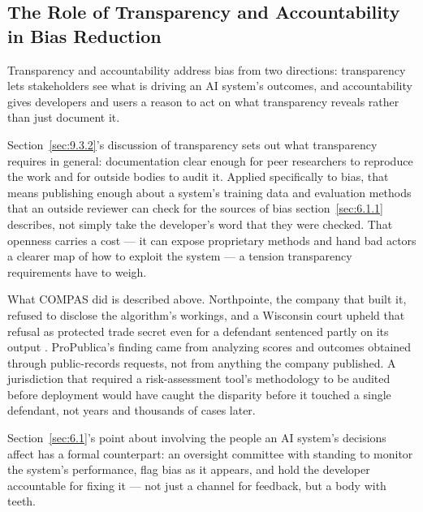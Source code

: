 \subsection{The Role of Transparency and Accountability in Bias Reduction}
\label{sec:6.1.3}
Transparency and accountability address bias from two directions: transparency lets stakeholders see what is driving an AI system's outcomes, and accountability gives developers and users a reason to act on what transparency reveals rather than just document it.

Section~\ref{sec:9.3.2}'s discussion of transparency sets out what transparency requires in general: documentation clear enough for peer researchers to reproduce the work and for outside bodies to audit it. Applied specifically to bias, that means publishing enough about a system's training data and evaluation methods that an outside reviewer can check for the sources of bias section~\ref{sec:6.1.1} describes, not simply take the developer's word that they were checked. That openness carries a cost — it can expose proprietary methods and hand bad actors a clearer map of how to exploit the system — a tension transparency requirements have to weigh.

What COMPAS did is described above. Northpointe, the company that built it, refused to disclose the algorithm's workings, and a Wisconsin court upheld that refusal as protected trade secret even for a defendant sentenced partly on its output \autocite{loomis2016compas}. ProPublica's finding came from analyzing scores and outcomes obtained through public-records requests, not from anything the company published. A jurisdiction that required a risk-assessment tool's methodology to be audited before deployment would have caught the disparity before it touched a single defendant, not years and thousands of cases later.

Section~\ref{sec:6.1}'s point about involving the people an AI system's decisions affect has a formal counterpart: an oversight committee with standing to monitor the system's performance, flag bias as it appears, and hold the developer accountable for fixing it — not just a channel for feedback, but a body with teeth.

